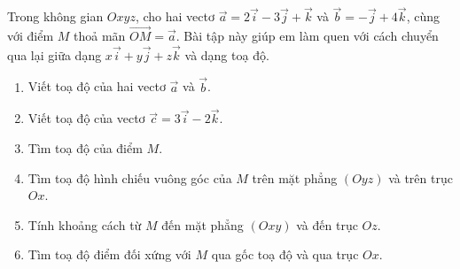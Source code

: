 \begin{bai}Trong không gian $Oxyz$, cho hai vectơ $\vec a=2\vec i-3\vec j+\vec k$ và $\vec b=-\vec j+4\vec k$, cùng với điểm $M$ thoả mãn $\overrightarrow{OM}=\vec a$. Bài tập này giúp em làm quen với cách chuyển qua lại giữa dạng $x\vec i+y\vec j+z\vec k$ và dạng toạ độ.
\begin{enumerate}[label=\alph*)]
\item Viết toạ độ của hai vectơ $\vec a$ và $\vec b$.
\item Viết toạ độ của vectơ $\vec c=3\vec i-2\vec k$.
\item Tìm toạ độ của điểm $M$.
\item Tìm toạ độ hình chiếu vuông góc của $M$ trên mặt phẳng $(Oyz)$ và trên trục $Ox$.
\item Tính khoảng cách từ $M$ đến mặt phẳng $(Oxy)$ và đến trục $Oz$.
\item Tìm toạ độ điểm đối xứng với $M$ qua gốc toạ độ và qua trục $Ox$.
\end{enumerate}
\end{bai}

